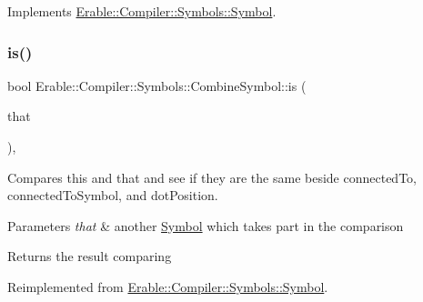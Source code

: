 Implements \mbox{\hyperlink{class_erable_1_1_compiler_1_1_symbols_1_1_symbol_a781d595ec8d14efcdbbf6d6123af1f50}{Erable\+::\+Compiler\+::\+Symbols\+::\+Symbol}}.

\mbox{\label{struct_erable_1_1_compiler_1_1_symbols_1_1_combine_symbol_a3adc7ddbb9d1cb974cdd56200929911f}} 
\subsubsection{\texorpdfstring{is()}{is()}}
{\footnotesize\ttfamily bool Erable\+::\+Compiler\+::\+Symbols\+::\+Combine\+Symbol\+::is (\begin{DoxyParamCaption}\item[{\mbox{\hyperlink{namespace_erable_1_1_compiler_1_1_symbols_a8f0bc762f448ea4d84e8713ab3e140b9}{Symbol\+Ptr}}}]{that }\end{DoxyParamCaption})\hspace{0.3cm}{\ttfamily [override]}, {\ttfamily [virtual]}}

Compares this and that and see if they are the same beside connected\+To, connected\+To\+Symbol, and dot\+Position. 
\begin{DoxyParams}{Parameters}
{\em that} & another \mbox{\hyperlink{class_erable_1_1_compiler_1_1_symbols_1_1_symbol}{Symbol}} which takes part in the comparison \\
\hline
\end{DoxyParams}
\begin{DoxyReturn}{Returns}
the result comparing 
\end{DoxyReturn}


Reimplemented from \mbox{\hyperlink{class_erable_1_1_compiler_1_1_symbols_1_1_symbol_a0d50ab85e48e583a4664a1fa37fe6791}{Erable\+::\+Compiler\+::\+Symbols\+::\+Symbol}}.

\mbox{\label{struct_erable_1_1_compiler_1_1_symbols_1_1_combine_symbol_aedd44bc23607d42bdb45a35aba3dd184}} 
